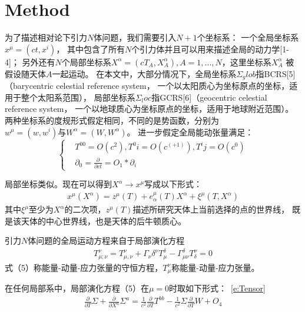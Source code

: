 \documentclass{ctexart}
\begin{document}
\section{Method}
\par 为了描述相对论下引力$N$体问题，我们需要引入$N+1$个坐标系：
一个全局坐标系$x^\mu=(ct,x^i)$，
其中包含了所有$N$个引力体并且可以用来描述全局的动力学[1-4]；
另外还有$N$个局部坐标系$X^\alpha=(cT_A,X_A^α),A=1,...,N$，这里坐标系$X_A^\alpha$
被假设随天体$A$一起运动。
在本文中，大部分情况下，全局坐标系$\Sigma_glob$指BCRS[5]（barycentric celestial reference system，
一个以太阳质心为坐标原点的坐标，适用于整个太阳系范围），
局部坐标系$\Sigma_loc$指GCRS[6]（geocentric celestial reference system，
一个以地球质心为坐标原点的坐标，适用于地球附近范围）。
两种坐标系的度规形式假定相同，不同的是势函数，分别为$w^\mu=(w,w^i )与W^\alpha=(W,W^\alpha)$。
进一步假定全局能动张量满足：
\begin{equation}
   \left\{
   \begin{aligned}
   &T^00=O(c^2),T^0i=O(c^(+1)),T^ij=O(c^0) \\
   &\partial_0=\frac{\partial}{\partial ct}=O_1*\partial_i
   \end{aligned}
   \right.
\end{equation}
\par 局部坐标类似。现在可以得到$X^\alpha \rightarrow x^\mu$写成以下形式：
\begin{equation}
  \begin{aligned}
   x^\mu(X^\alpha )=z^\mu (T)+e_\alpha^\mu (T) X^\alpha+\xi^\mu (T,X^\alpha)
  \end{aligned}
\end{equation}
其中$\xi^\mu$至少为$X^\alpha$的二次项，$z^\mu(T)$描述所研究天体上当前选择的点的世界线，
既是该天体的中心世界线，也是天体的后牛顿质心。
\par 引力$N$体问题的全局运动方程来自于局部演化方程
\begin{equation}\label{e:Tensor}
  \begin{aligned}
   T_{\mu;\nu}^\nu=T_{\mu,\nu}^\nu+Γ_\nu\delta^\nu T_\mu^\delta-\Gamma_{\mu\nu}^\delta T_\delta^\nu=0
  \end{aligned}
\end{equation}
式（5）称能量-动量-应力张量的守恒方程，$T_\mu^\nu$称能量-动量-应力张量。
\par 在任何局部系中，局部演化方程（5）在$\mu=0$时取如下形式：~\ref{e:Tensor}
\begin{equation}
  \begin{aligned}
  \frac{\partial}{\partial T} \Sigma + \frac{\partial}{\partial X^a } \Sigma ^a
  =\frac{1}{c^2} \frac{\partial }{\partial T}T^{bb}
  -\frac{1}{c^2} \Sigma \frac{\partial}{\partial T} W+O_4
  \end{aligned}
\end{equation}
\end{document}
